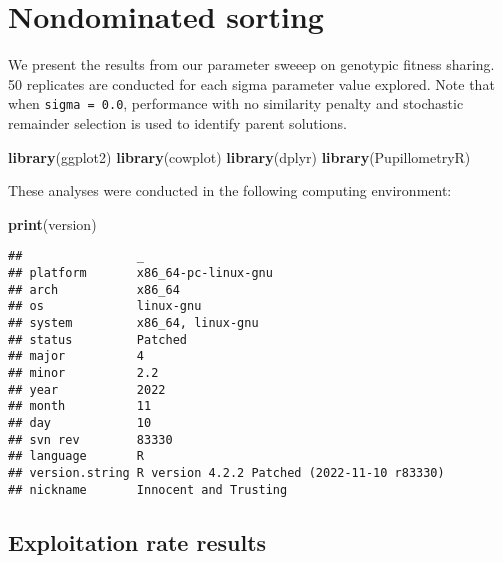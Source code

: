 \documentclass[]{book}
\newenvironment{Shaded}{\begin{snugshade}}{\end{snugshade}}
\newcommand{\KeywordTok}[1]{\textcolor[rgb]{0.13,0.29,0.53}{\textbf{#1}}}
\newcommand{\NormalTok}[1]{#1}
\begin{document}
\hypertarget{nondominated-sorting}{%
\chapter{Nondominated sorting}\label{nondominated-sorting}}

We present the results from our parameter sweeep on genotypic fitness sharing.
50 replicates are conducted for each sigma parameter value explored.
Note that when \texttt{sigma\ =\ 0.0}, performance with no similarity penalty and stochastic remainder selection is used to identify parent solutions.

\begin{Shaded}
\begin{Highlighting}[]
\KeywordTok{library}\NormalTok{(ggplot2)}
\KeywordTok{library}\NormalTok{(cowplot)}
\KeywordTok{library}\NormalTok{(dplyr)}
\KeywordTok{library}\NormalTok{(PupillometryR)}
\end{Highlighting}
\end{Shaded}

These analyses were conducted in the following computing environment:

\begin{Shaded}
\begin{Highlighting}[]
\KeywordTok{print}\NormalTok{(version)}
\end{Highlighting}
\end{Shaded}

\begin{verbatim}
##                _                                          
## platform       x86_64-pc-linux-gnu                        
## arch           x86_64                                     
## os             linux-gnu                                  
## system         x86_64, linux-gnu                          
## status         Patched                                    
## major          4                                          
## minor          2.2                                        
## year           2022                                       
## month          11                                         
## day            10                                         
## svn rev        83330                                      
## language       R                                          
## version.string R version 4.2.2 Patched (2022-11-10 r83330)
## nickname       Innocent and Trusting
\end{verbatim}

\hypertarget{exploitation-rate-results-5}{%
\section{Exploitation rate results}\label{exploitation-rate-results-5}}
\end{document}
